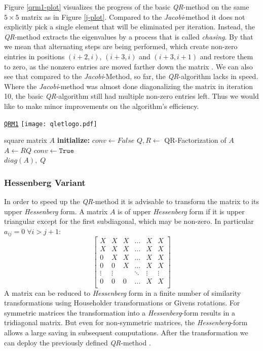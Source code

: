\documentclass[12pt]{article}
\begin{document}
Figure \ref{qrm1-plot} visualizes the progress of the basic \textit{QR}-method on the same $5 \times 5$ matrix as in Figure \ref{j-plot}. Compared to the \textit{Jacobi}-method it does not explicitly pick a single element that will be eliminated per iteration. Instead, the \textit{QR}-method extracts the eigenvalues by a process that is called \textit{chasing}. By that we mean that alternating steps are being performed, which create non-zero eintries in positions $(i+2, i)$, $(i+3, i)$ and $(i+3, i+1)$ and restore them to zero, as the nonzero entries are moved farther down the matrix \citep[p. 130]{NLA}. We can also see that compared to the \textit{Jacobi}-Method, so far, the \textit{QR}-algorithm lacks in speed. Where the \textit{Jacobi}-method was almost done diagonalizing the matrix in iteration 10, the basic \textit{QR}-algorithm still had multiple non-zero entries left. Thus we would like to make minor improvements on the algorithm's efficiency.
\begin{algorithm}
\caption{\href {https://github.com/thsis/NIS18/blob/master/algorithms/eigen.py}{\texttt{QRM1}}  \protect\texttt{[image: qletlogo.pdf]}}
\label{qr1-meth}
  \begin{algorithmic}[1]
    \Require square matrix $A$
    \Statex \textbf{initialize: } $conv \gets False$
      \State $Q, R \gets$ QR-Factorization of $A$
      \State $A \gets RQ$
        \State $conv \gets \texttt{True}$
      \EndIf
    \EndWhile\\
    \Return $diag\left(A\right),\; Q$
  \end{algorithmic}
\end{algorithm}


\subsubsection{Hessenberg Variant}

In order to speed up the \textit{QR}-method it is advisable to transform the matrix to its upper \textit{Hessenberg} form. A matrix $A$ is of upper \textit{Hessenberg} form if it is upper triangular except for the first subdiagonal, which may be non-zero. In particular $a_{ij} = 0\; \forall i > j + 1$:
\small
$$
\begin{bmatrix}
X & X & X  & \dots &  X & X\\
X & X & X &  \dots &  X & X\\
0 & X & X &  \dots &  X & X\\
0 & 0 & X &  \dots &  X & X \\
\vdots &  \vdots & & \ddots  & \vdots  & \vdots\\
0 & 0 & 0 &  \dots &  X & X \\
\end{bmatrix}$$
\normalsize
A matrix can be reduced to \textit{Hessenberg} form in a finite number of similarity transformations using Householder transformations or Givens rotations. For symmetric matrices the transformation into a \textit{Hessenberg}-form results in a tridiagonal matrix. But even for non-symmetric matrices, the \textit{Hessenberg}-form allows a large saving in subsequent computations. After the transformation we can deploy the previously defined \textit{QR}-method \citep[p. 130]{NLA}.
\end{document}

